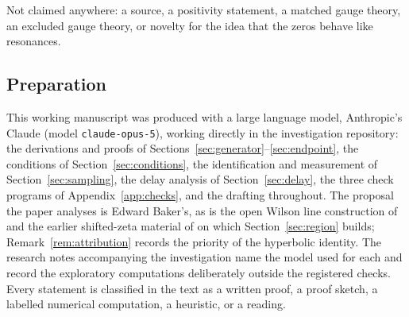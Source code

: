 Not claimed anywhere: a source, a positivity statement, a matched gauge theory,
an excluded gauge theory, or novelty for the idea that the zeros behave like
resonances.

\subsection*{Preparation}

This working manuscript was produced with a large language model, Anthropic's
Claude (model \texttt{claude-opus-5}), working directly in the investigation
repository: the derivations and proofs of
Sections~\ref{sec:generator}--\ref{sec:endpoint}, the conditions of
Section~\ref{sec:conditions}, the identification and measurement of
Section~\ref{sec:sampling}, the delay analysis of Section~\ref{sec:delay}, the
three check programs of Appendix~\ref{app:checks}, and the drafting throughout. The proposal the paper analyses is Edward Baker's, as is
the open Wilson line construction of \cite{OWL} and the earlier shifted-zeta
material of \cite{CriticalPath,CumulativePath} on which Section~\ref{sec:region}
builds; Remark~\ref{rem:attribution} records the priority of the hyperbolic
identity. The research notes accompanying the investigation name the model used
for each and record the exploratory computations deliberately outside the
registered checks. Every statement is classified in the text as a written proof,
a proof sketch, a labelled numerical computation, a heuristic, or a reading.
